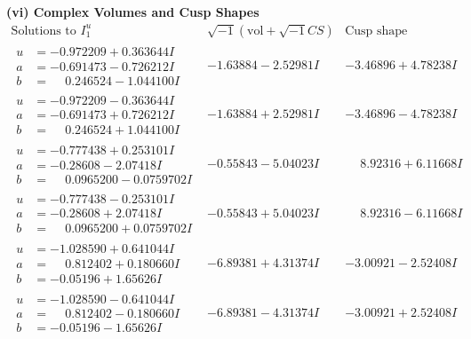 \documentclass[1p]{elsarticle_modified}
\theoremstyle{definition}
\newcommand{\I}{\sqrt{-1}}
\begin{document}
\newpage\flushleft \textbf{(vi) Complex Volumes and Cusp Shapes}
$$\begin{array}{c|c|c}  
\text{Solutions to }I^u_{1}& \I (\text{vol} + \sqrt{-1}CS) & \text{Cusp shape}\\
 \hline 
\begin{aligned}
u &= -0.972209 + 0.363644 I \\
a &= -0.691473 - 0.726212 I \\
b &= \phantom{-}0.246524 - 1.044100 I\end{aligned}
 & -1.63884 - 2.52981 I & -3.46896 + 4.78238 I \\ \hline\begin{aligned}
u &= -0.972209 - 0.363644 I \\
a &= -0.691473 + 0.726212 I \\
b &= \phantom{-}0.246524 + 1.044100 I\end{aligned}
 & -1.63884 + 2.52981 I & -3.46896 - 4.78238 I \\ \hline\begin{aligned}
u &= -0.777438 + 0.253101 I \\
a &= -0.28608 - 2.07418 I \\
b &= \phantom{-}0.0965200 - 0.0759702 I\end{aligned}
 & -0.55843 - 5.04023 I & \phantom{-}8.92316 + 6.11668 I \\ \hline\begin{aligned}
u &= -0.777438 - 0.253101 I \\
a &= -0.28608 + 2.07418 I \\
b &= \phantom{-}0.0965200 + 0.0759702 I\end{aligned}
 & -0.55843 + 5.04023 I & \phantom{-}8.92316 - 6.11668 I \\ \hline\begin{aligned}
u &= -1.028590 + 0.641044 I \\
a &= \phantom{-}0.812402 + 0.180660 I \\
b &= -0.05196 + 1.65626 I\end{aligned}
 & -6.89381 + 4.31374 I & -3.00921 - 2.52408 I \\ \hline\begin{aligned}
u &= -1.028590 - 0.641044 I \\
a &= \phantom{-}0.812402 - 0.180660 I \\
b &= -0.05196 - 1.65626 I\end{aligned}
 & -6.89381 - 4.31374 I & -3.00921 + 2.52408 I \\ \hline\begin{aligned}

\end{aligned}
\end{array}$$
\end{document}
